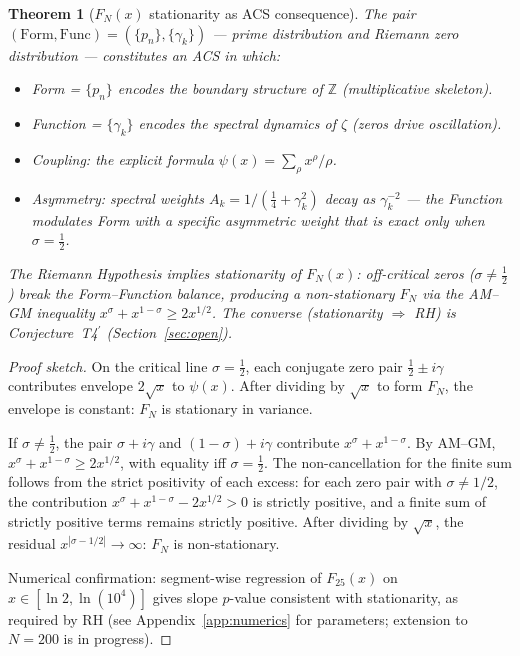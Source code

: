 \documentclass[12pt,a4paper]{article}
\theoremstyle{plain}
\newtheorem{theorem}{Theorem}[section]
\theoremstyle{definition}
\theoremstyle{remark}
\begin{document}
\begin{theorem}[$F_N(x)$ stationarity as ACS consequence]\label{thm:FN-acs}\label{thm:T4}
The pair $(\mathrm{Form}, \mathrm{Func}) = (\{p_n\}, \{\gamma_k\})$ --- prime 
distribution and Riemann zero distribution --- constitutes an ACS in which:
\begin{itemize}[noitemsep]
  \item Form = $\{p_n\}$ encodes the boundary structure of $\mathbb{Z}$ 
    (multiplicative skeleton).
  \item Function = $\{\gamma_k\}$ encodes the spectral dynamics of $\zeta$ 
    (zeros drive oscillation).
  \item Coupling: the explicit formula $\psi(x) = \sum_\rho x^\rho/\rho$.
  \item Asymmetry: spectral weights $A_k = 1/(\tfrac{1}{4}+\gamma_k^2)$ 
    decay as $\gamma_k^{-2}$ --- the Function modulates Form with a specific 
    asymmetric weight that is exact only when $\sigma = \tfrac{1}{2}$.
\end{itemize}
The Riemann Hypothesis \emph{implies} stationarity of $F_N(x)$: 
off-critical zeros ($\sigma \neq \tfrac{1}{2}$) break the 
Form--Function balance, producing a non-stationary $F_N$ via the 
AM--GM inequality $x^\sigma + x^{1-\sigma} \geq 2x^{1/2}$. 
The converse (stationarity $\Rightarrow$ RH) is Conjecture~T4$^\prime$ 
(Section~\ref{sec:open}).
\end{theorem}

\begin{proof}[Proof sketch]
On the critical line $\sigma = \tfrac{1}{2}$, each conjugate zero pair 
$\tfrac{1}{2} \pm i\gamma$ contributes envelope $2\sqrt{x}$ to $\psi(x)$.  
After dividing by $\sqrt{x}$ to form $F_N$, the envelope is constant: 
$F_N$ is stationary in variance.

If $\sigma \neq \tfrac{1}{2}$, the pair $\sigma + i\gamma$ and 
$(1-\sigma) + i\gamma$ contribute $x^\sigma + x^{1-\sigma}$.  
By AM--GM, $x^\sigma + x^{1-\sigma} \geq 2x^{1/2}$, with equality 
iff $\sigma = \tfrac{1}{2}$.  The non-cancellation for the finite sum
follows from the strict positivity of each excess:
for each zero pair with $\sigma \neq 1/2$, the contribution
$x^\sigma + x^{1-\sigma} - 2x^{1/2} > 0$ is strictly positive,
and a finite sum of strictly positive terms remains strictly positive.
After dividing by $\sqrt{x}$, the 
residual $x^{|\sigma - 1/2|} \to \infty$: $F_N$ is non-stationary.

Numerical confirmation: segment-wise regression of $F_{25}(x)$ on 
$x \in [\ln 2, \ln(10^4)]$ gives slope $p$-value consistent 
with stationarity, as required by RH
(see Appendix~\ref{app:numerics} for parameters;
extension to $N = 200$ is in progress).
\end{proof}
\end{document}
